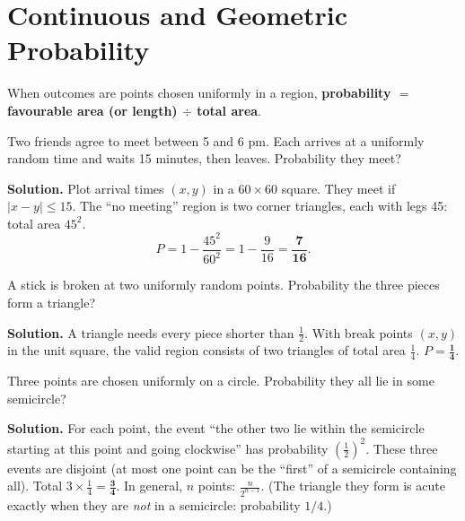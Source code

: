 \documentclass[11pt,a4paper,openany]{report}
\begin{document}
\chapter{Continuous and Geometric Probability}\label{ch:geo}

When outcomes are points chosen uniformly in a region, \textbf{probability $=$ favourable area (or length) $\div$ total area}.

\begin{example}
Two friends agree to meet between 5 and 6 pm. Each arrives at a uniformly random time and waits 15 minutes, then leaves. Probability they meet?

\textbf{Solution.} Plot arrival times $(x,y)$ in a $60\times60$ square. They meet if $|x-y|\le15$. The ``no meeting'' region is two corner triangles, each with legs 45: total area $45^2$.
\[P=1-\frac{45^2}{60^2}=1-\frac9{16}=\mathbf{\frac7{16}}.\]
\begin{center}
\end{center}
\end{example}

\begin{example}
A stick is broken at two uniformly random points. Probability the three pieces form a triangle?

\textbf{Solution.} A triangle needs every piece shorter than $\frac12$. With break points $(x,y)$ in the unit square, the valid region consists of two triangles of total area $\frac14$. $P=\mathbf{\frac14}$.
\end{example}

\begin{example}
Three points are chosen uniformly on a circle. Probability they all lie in some semicircle?

\textbf{Solution.} For each point, the event ``the other two lie within the semicircle starting at this point and going clockwise'' has probability $\left(\frac12\right)^2$. These three events are disjoint (at most one point can be the ``first'' of a semicircle containing all). Total $3\times\frac14=\mathbf{\frac34}$. In general, $n$ points: $\frac n{2^{n-1}}$.
(The triangle they form is acute exactly when they are \emph{not} in a semicircle: probability $1/4$.)
\end{example}
\end{document}
